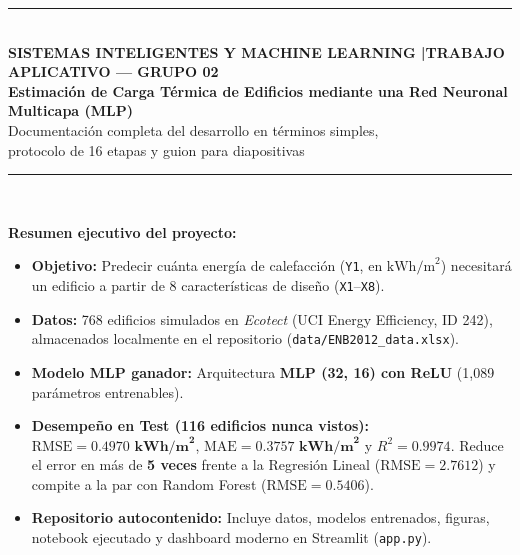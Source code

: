\documentclass[11pt,a4paper]{article}
\begin{document}
\begin{titlepage}
    \centering
    \vspace*{0.8cm}
    {\color{PrimaryGreen}\rule{\textwidth}{2pt}}\\[0.5cm]
    {\small\bfseries SISTEMAS INTELIGENTES Y MACHINE LEARNING \quad|\quad TRABAJO APLICATIVO — GRUPO 02}\\[1.1cm]
    {\Huge\bfseries\color{NavyBlue} Estimación de Carga Térmica de Edificios mediante una Red Neuronal Multicapa (MLP)}\\[0.5cm]
    {\Large\color{PrimaryGreen} Documentación completa del desarrollo en términos simples,\\ protocolo de 16 etapas y guion para diapositivas}\\[0.8cm]
    {\color{PrimaryGreen}\rule{\textwidth}{1pt}}\\[1.4cm]

    \begin{tcolorbox}[colback=SoftBg,colframe=PrimaryGreen,width=0.9\textwidth,arc=4pt]
        \textbf{Resumen ejecutivo del proyecto:}
        \begin{itemize}[leftmargin=1.2em,itemsep=3pt]
            \item \textbf{Objetivo:} Predecir cuánta energía de calefacción (\texttt{Y1}, en $\text{kWh/m}^2$) necesitará un edificio a partir de 8 características de diseño (\texttt{X1}–\texttt{X8}).
            \item \textbf{Datos:} 768 edificios simulados en \textit{Ecotect} (UCI Energy Efficiency, ID 242), almacenados localmente en el repositorio (\texttt{data/ENB2012\_data.xlsx}).
            \item \textbf{Modelo MLP ganador:} Arquitectura \textbf{MLP (32, 16) con ReLU} (1,089 parámetros entrenables).
            \item \textbf{Desempeño en Test (116 edificios nunca vistos):} $\text{RMSE} = \mathbf{0.4970\text{ kWh/m}^2}$, $\text{MAE} = \mathbf{0.3757\text{ kWh/m}^2}$ y $R^2 = \mathbf{0.9974}$. Reduce el error en más de \textbf{5 veces} frente a la Regresión Lineal ($\text{RMSE} = 2.7612$) y compite a la par con Random Forest ($\text{RMSE} = 0.5406$).
            \item \textbf{Repositorio autocontenido:} Incluye datos, modelos entrenados, figuras, notebook ejecutado y dashboard moderno en Streamlit (\texttt{app.py}).
        \end{itemize}
    \end{tcolorbox}


\end{titlepage}
\end{document}
